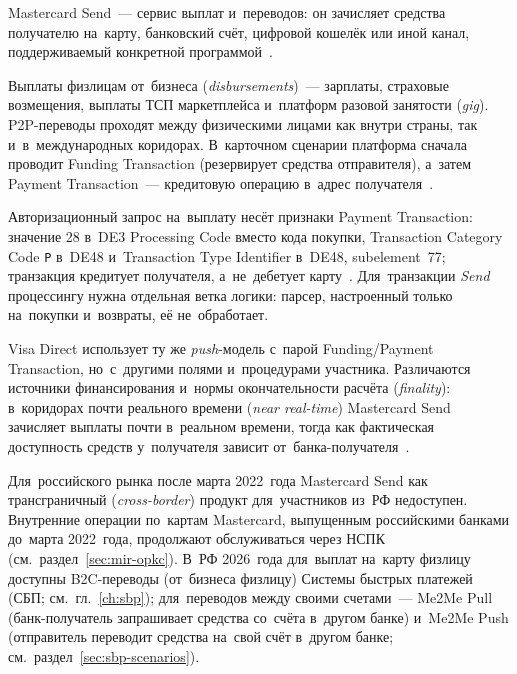 Mastercard Send~--- сервис выплат и~переводов: он зачисляет средства
получателю на~карту, банковский счёт, цифровой кошелёк или иной канал,
поддерживаемый конкретной программой~\cite{mc-send-aptpay}.

Выплаты физлицам от~бизнеса (\textit{disbursements})~--- зарплаты, страховые
возмещения, выплаты ТСП маркетплейса и~платформ разовой занятости (\textit{gig}).
P2P-переводы проходят между физическими лицами как внутри страны, так
и~в~международных коридорах. В~карточном сценарии платформа сначала проводит
Funding Transaction (резервирует средства отправителя), а~затем
Payment Transaction~--- кредитовую операцию в~адрес
получателя~\cite{mc-tpr}.

Авторизационный запрос на~выплату несёт признаки Payment Transaction:
значение 28 в~DE3 Processing Code вместо кода покупки, Transaction Category
Code \texttt{P} в~DE48 и~Transaction Type Identifier в~DE48, subelement~77;
транзакция кредитует получателя, а~не~дебетует карту~\cite{mc-tpr}. Для~транзакции \textit{Send} процессингу нужна отдельная
ветка логики: парсер, настроенный только на~покупки и~возвраты, её
не~обработает.

Visa Direct использует ту же \textit{push}-модель с~парой Funding/Payment
Transaction, но~с~другими полями и~процедурами участника. Различаются
источники финансирования и~нормы окончательности расчёта
(\textit{finality}): в~коридорах почти реального времени (\textit{near
real-time}) Mastercard Send зачисляет выплаты почти в~реальном времени, тогда
как фактическая доступность средств у~получателя зависит
от~банка-получателя~\cite{mc-send-aptpay}.

Для~российского рынка после марта 2022~года Mastercard Send как трансграничный
(\textit{cross-border}) продукт для~участников из~РФ недоступен. Внутренние
операции по~картам Mastercard, выпущенным российскими банками до~марта
2022~года, продолжают обслуживаться через НСПК (см.~раздел~\ref{sec:mir-opkc}).
В~РФ 2026~года для~выплат на~карту физлицу доступны B2C-переводы
(от~бизнеса физлицу) Системы быстрых платежей (СБП; см.~гл.~\ref{ch:sbp});
для~переводов между своими счетами~--- Me2Me Pull (банк-получатель запрашивает
средства со~счёта в~другом банке) и~Me2Me Push (отправитель переводит средства
на~свой счёт в~другом банке; см.~раздел~\ref{sec:sbp-scenarios}).

